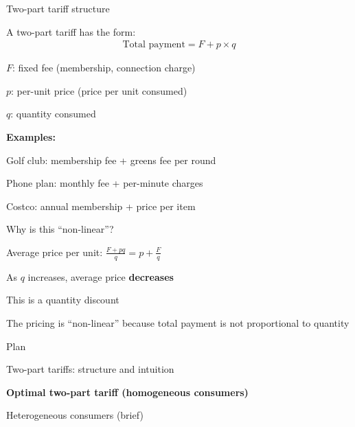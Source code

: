 \documentclass[notes,11pt, aspectratio=169]{beamer}
\newenvironment{wideitemize}{\itemize\addtolength{\itemsep}{10pt}}{\enditemize}
\newenvironment{wideenumerate}{\enumerate\addtolength{\itemsep}{10pt}}{\endenumerate}
\begin{document}
\begin{frame}{Two-part tariff structure}
	\begin{wideitemize}
		\item A two-part tariff has the form:
		\begin{align*}
			\text{Total payment} = F + p \times q
		\end{align*}
		\item $F$: fixed fee (membership, connection charge)
		\item $p$: per-unit price (price per unit consumed)
		\item $q$: quantity consumed
		\item \textbf{Examples:}
		\begin{wideitemize}
			\vspace{5pt}
			\item Golf club: membership fee + greens fee per round
			\item Phone plan: monthly fee + per-minute charges
			\item Costco: annual membership + price per item
		\end{wideitemize}
	\end{wideitemize}
\end{frame}

\begin{frame}{Why is this ``non-linear''?}
	\begin{wideitemize}
		\item Average price per unit: $\frac{F + pq}{q} = p + \frac{F}{q}$
		\item As $q$ increases, average price \textbf{decreases}
		\item This is a quantity discount
		\item The pricing is ``non-linear'' because total payment is not proportional to quantity
	\end{wideitemize}
\end{frame}

\begin{frame}{Plan}
  \begin{wideenumerate}
    \item Two-part tariffs: structure and intuition
    \item \textbf{Optimal two-part tariff (homogeneous consumers)}
    \item Heterogeneous consumers (brief)
  \end{wideenumerate}
\end{frame}
\end{document}
